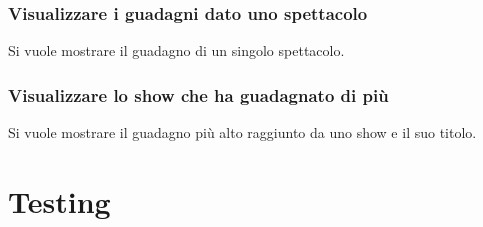 \documentclass[a4paper,11pt]{article}
\begin{document}
\subsubsection{Visualizzare i guadagni dato uno spettacolo}
Si vuole mostrare il guadagno di un singolo spettacolo.


\subsubsection{Visualizzare lo show che ha guadagnato di più}
Si vuole mostrare il guadagno più alto raggiunto da uno show e il suo titolo.


\section{Testing}
\end{document}
